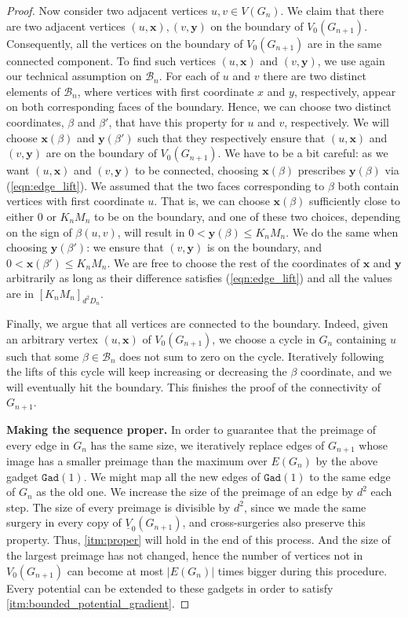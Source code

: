 \documentclass[10pt,a4paper]{amsart}
\begin{document}
\begin{proof}
Now consider two adjacent vertices $u,v \in V(G_n)$. We claim that there are two adjacent vertices $(u, \mathbf{x}),(v,\mathbf{y})$ on the boundary of $V_0(G_{n+1})$. Consequently, all the vertices on the boundary of $V_0(G_{n+1})$ are in the same connected component.   
To find such vertices $(u, \mathbf{x})$ and $(v,\mathbf{y})$, we use again our technical assumption on $\mathcal{B}_n$. For each of $u$ and $v$ there are two distinct elements of $\mathcal{B}_n$, where vertices with first coordinate $x$ and $y$, respectively, appear on both corresponding faces of the boundary. Hence, we can choose two distinct coordinates, $\beta$ and $\beta'$, that have this property for $u$ and $v$, respectively. We will choose $\mathbf{x}(\beta)$ and $\mathbf{y}(\beta')$ such that they respectively ensure that $(u, \mathbf{x})$ and $(v,\mathbf{y})$ are on the boundary of $V_0(G_{n+1})$. We have to be a bit careful: as we want $(u, \mathbf{x})$ and $(v,\mathbf{y})$ to be connected, choosing $\mathbf{x}(\beta)$ prescribes $\mathbf{y}(\beta)$ via (\ref{eqn:edge_lift}). We assumed that the two faces corresponding to $\beta$ both contain vertices with first coordinate $u$. That is, we can choose $\mathbf{x}(\beta)$ sufficiently close to either $0$ or $K_nM_n$ to be on the boundary, and one of these two choices, depending on the sign of $\beta(u,v)$, will result in $0 < \mathbf{y}(\beta) \leq K_nM_n$. We do the same when choosing $\mathbf{y}(\beta')$: we ensure that $(v,\mathbf{y})$ is on the boundary, and $0<\mathbf{x}(\beta')\leq K_nM_n$. We are free to choose the rest of the coordinates of $\mathbf{x}$ and $\mathbf{y}$ arbitrarily as long as their difference satisfies (\ref{eqn:edge_lift}) and all the values are in $[K_nM_n]_{d^2D_n}$.

Finally, we argue that all vertices are connected to the boundary. Indeed, given an arbitrary vertex $(u,\mathbf{x})$ of $V_0(G_{n+1})$, we choose a cycle in $G_n$ containing $u$ such that some $\beta \in \mathcal{B}_n$ does not sum to zero on the cycle. Iteratively following the lifts of this cycle will keep increasing or decreasing the $\beta$ coordinate, and we will eventually hit the boundary. This finishes the proof of the connectivity of $G_{n+1}$.

{\bf Making the sequence proper.} In order to guarantee that the preimage of every edge in $G_n$ has the same size, we iteratively replace edges of $G_{n+1}$ whose image has a smaller preimage than the maximum over $E(G_n)$ by the above gadget $\texttt{Gad}(1)$. We might map all the new edges of $\texttt{Gad}(1)$ to the same edge of $G_n$ as the old one. We increase the size of the preimage of an edge by $d^2$ each step. The size of every preimage is divisible by $d^2$, since we made the same surgery in every copy of $\underline{V}_0(G_{n+1})$, and cross-surgeries also preserve this property. Thus, \ref{itm:proper} will hold in the end of this process. And the size of the largest preimage has not changed, hence the number of vertices not in $V_0(G_{n+1})$ can become at most $|E(G_n)|$ times bigger during this procedure.
Every potential can be extended to these gadgets in order to satisfy \ref{itm:bounded_potential_gradient}.


\end{proof}
\end{document}
